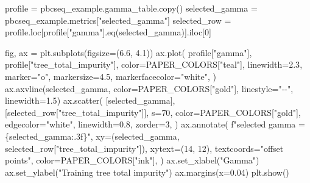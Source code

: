 \documentclass[
  letterpaper,
  DIV=11,
  numbers=noendperiod]{scrartcl}
\newenvironment{Shaded}{\begin{snugshade}}{\end{snugshade}}
\newcommand{\DecValTok}[1]{\textcolor[rgb]{0.68,0.00,0.00}{#1}}
\newcommand{\FloatTok}[1]{\textcolor[rgb]{0.68,0.00,0.00}{#1}}
\newcommand{\NormalTok}[1]{\textcolor[rgb]{0.00,0.23,0.31}{#1}}
\newcommand{\OperatorTok}[1]{\textcolor[rgb]{0.37,0.37,0.37}{#1}}
\newcommand{\SpecialCharTok}[1]{\textcolor[rgb]{0.37,0.37,0.37}{#1}}
\newcommand{\SpecialStringTok}[1]{\textcolor[rgb]{0.13,0.47,0.30}{#1}}
\newcommand{\StringTok}[1]{\textcolor[rgb]{0.13,0.47,0.30}{#1}}
\begin{document}
\begin{Shaded}
\begin{Highlighting}[]
\NormalTok{profile }\OperatorTok{=}\NormalTok{ pbcseq\_example.gamma\_table.copy()}
\NormalTok{selected\_gamma }\OperatorTok{=}\NormalTok{ pbcseq\_example.metrics[}\StringTok{"selected\_gamma"}\NormalTok{]}
\NormalTok{selected\_row }\OperatorTok{=}\NormalTok{ profile.loc[profile[}\StringTok{"gamma"}\NormalTok{].eq(selected\_gamma)].iloc[}\DecValTok{0}\NormalTok{]}

\NormalTok{fig, ax }\OperatorTok{=}\NormalTok{ plt.subplots(figsize}\OperatorTok{=}\NormalTok{(}\FloatTok{6.6}\NormalTok{, }\FloatTok{4.1}\NormalTok{))}
\NormalTok{ax.plot(}
\NormalTok{    profile[}\StringTok{"gamma"}\NormalTok{],}
\NormalTok{    profile[}\StringTok{"tree\_total\_impurity"}\NormalTok{],}
\NormalTok{    color}\OperatorTok{=}\NormalTok{PAPER\_COLORS[}\StringTok{"teal"}\NormalTok{],}
\NormalTok{    linewidth}\OperatorTok{=}\FloatTok{2.3}\NormalTok{,}
\NormalTok{    marker}\OperatorTok{=}\StringTok{"o"}\NormalTok{,}
\NormalTok{    markersize}\OperatorTok{=}\FloatTok{4.5}\NormalTok{,}
\NormalTok{    markerfacecolor}\OperatorTok{=}\StringTok{"white"}\NormalTok{,}
\NormalTok{)}
\NormalTok{ax.axvline(selected\_gamma, color}\OperatorTok{=}\NormalTok{PAPER\_COLORS[}\StringTok{"gold"}\NormalTok{], linestyle}\OperatorTok{=}\StringTok{"{-}{-}"}\NormalTok{, linewidth}\OperatorTok{=}\FloatTok{1.5}\NormalTok{)}
\NormalTok{ax.scatter(}
\NormalTok{    [selected\_gamma],}
\NormalTok{    [selected\_row[}\StringTok{"tree\_total\_impurity"}\NormalTok{]],}
\NormalTok{    s}\OperatorTok{=}\DecValTok{70}\NormalTok{,}
\NormalTok{    color}\OperatorTok{=}\NormalTok{PAPER\_COLORS[}\StringTok{"gold"}\NormalTok{],}
\NormalTok{    edgecolor}\OperatorTok{=}\StringTok{"white"}\NormalTok{,}
\NormalTok{    linewidth}\OperatorTok{=}\FloatTok{0.8}\NormalTok{,}
\NormalTok{    zorder}\OperatorTok{=}\DecValTok{3}\NormalTok{,}
\NormalTok{)}
\NormalTok{ax.annotate(}
    \SpecialStringTok{f"selected gamma = }\SpecialCharTok{\{}\NormalTok{selected\_gamma}\SpecialCharTok{:.3f\}}\SpecialStringTok{"}\NormalTok{,}
\NormalTok{    xy}\OperatorTok{=}\NormalTok{(selected\_gamma, selected\_row[}\StringTok{"tree\_total\_impurity"}\NormalTok{]),}
\NormalTok{    xytext}\OperatorTok{=}\NormalTok{(}\DecValTok{14}\NormalTok{, }\DecValTok{12}\NormalTok{),}
\NormalTok{    textcoords}\OperatorTok{=}\StringTok{"offset points"}\NormalTok{,}
\NormalTok{    color}\OperatorTok{=}\NormalTok{PAPER\_COLORS[}\StringTok{"ink"}\NormalTok{],}
\NormalTok{)}
\NormalTok{ax.set\_xlabel(}\StringTok{"Gamma"}\NormalTok{)}
\NormalTok{ax.set\_ylabel(}\StringTok{"Training tree total impurity"}\NormalTok{)}
\NormalTok{ax.margins(x}\OperatorTok{=}\FloatTok{0.04}\NormalTok{)}
\NormalTok{plt.show()}
\end{Highlighting}
\end{Shaded}
\end{document}
